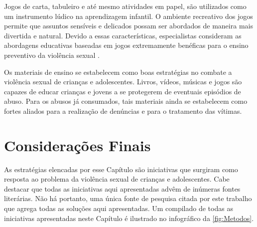 Jogos de carta, tabuleiro e até mesmo atividades em papel, são utilizados como um instrumento lúdico na aprendizagem infantil. O ambiente recreativo dos jogos permite que assuntos sensíveis e delicados possam ser abordados de maneira mais divertida e natural. Devido a essas características, especialistas consideram as abordagens educativas baseadas em jogos extremamente benéficas para o ensino preventivo da violência sexual \cite{meyer2017analise}.


Os materiais de ensino se estabelecem como boas estratégias no combate a violência sexual de crianças e adolescentes. Livros, vídeos, músicas e jogos são capazes de educar crianças e jovens a se protegerem de eventuais episódios de abuso. Para os abusos já consumados, tais materiais ainda se estabelecem como fortes aliados para a realização de denúncias e para o tratamento das vítimas. 


\section{Considerações Finais}\label{sec:finais}

As estratégias elencadas por esse Capítulo são iniciativas que surgiram como resposta ao problema da violência sexual de crianças e adolescentes. Cabe destacar que todas as iniciativas aqui apresentadas advêm de inúmeras fontes literárias. Não há portanto, uma única fonte de pesquisa citada por este trabalho que agrega todas as soluções aqui apresentadas. Um compilado de todas as iniciativas apresentadas neste Capítulo é ilustrado no infográfico da \autoref{fig:Metodos}.

\vspace{0.5cm}

